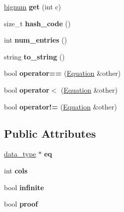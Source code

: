 \begin{DoxyCompactItemize}
\item 
\hypertarget{classEquation_a1e06388082f2d0053d59a1b002031359}{\hyperlink{classbignum}{bignum} {\bfseries get} (int c)}\label{classEquation_a1e06388082f2d0053d59a1b002031359}

\item 
\hypertarget{classEquation_a3f462be768a1a3de41082a105b136df5}{size\-\_\-t {\bfseries hash\-\_\-code} ()}\label{classEquation_a3f462be768a1a3de41082a105b136df5}

\item 
\hypertarget{classEquation_a56e0c6c802852672d550d7b3a3b2c7e1}{int {\bfseries num\-\_\-entries} ()}\label{classEquation_a56e0c6c802852672d550d7b3a3b2c7e1}

\item 
\hypertarget{classEquation_a4eb002a82db6629cc7c03e2aa7edbcd7}{string {\bfseries to\-\_\-string} ()}\label{classEquation_a4eb002a82db6629cc7c03e2aa7edbcd7}

\item 
\hypertarget{classEquation_afc920060931a12dd17d3eba1d5b841eb}{bool {\bfseries operator==} (\hyperlink{classEquation}{\-Equation} \&other)}\label{classEquation_afc920060931a12dd17d3eba1d5b841eb}

\item 
\hypertarget{classEquation_a63a03eff507ce27ce0e7847d5b64f2a0}{bool {\bfseries operator$<$} (\hyperlink{classEquation}{\-Equation} \&other)}\label{classEquation_a63a03eff507ce27ce0e7847d5b64f2a0}

\item 
\hypertarget{classEquation_aceed96723d9171e3ae90556d3f95d34d}{bool {\bfseries operator!=} (\hyperlink{classEquation}{\-Equation} \&other)}\label{classEquation_aceed96723d9171e3ae90556d3f95d34d}

\end{DoxyCompactItemize}
\subsection*{\-Public \-Attributes}
\begin{DoxyCompactItemize}
\item 
\hypertarget{classEquation_aff1a32ea7d7e1939439961668b604507}{\hyperlink{uniondata__type}{data\-\_\-type} $\ast$ {\bfseries eq}}\label{classEquation_aff1a32ea7d7e1939439961668b604507}

\item 
\hypertarget{classEquation_a46d28bf480c4f9f4d21e9f5c6c9e1ae5}{int {\bfseries cols}}\label{classEquation_a46d28bf480c4f9f4d21e9f5c6c9e1ae5}

\item 
\hypertarget{classEquation_a0dd3722641518121376463311d152fb2}{bool {\bfseries infinite}}\label{classEquation_a0dd3722641518121376463311d152fb2}

\item 
\hypertarget{classEquation_a7313041c526f4b27fead1c8474d72ba1}{bool {\bfseries proof}}\label{classEquation_a7313041c526f4b27fead1c8474d72ba1}

\end{DoxyCompactItemize}
